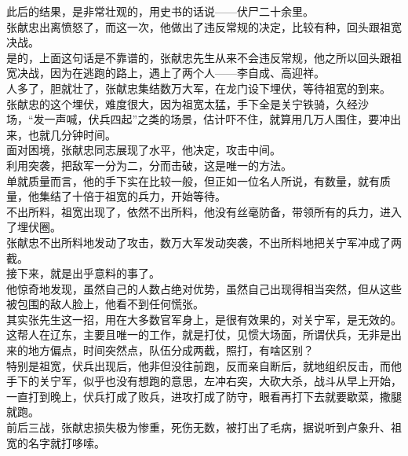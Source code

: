 \begin{multicols}{\theparacolNo}
此后的结果，是非常壮观的，用史书的话说——伏尸二十余里。\\

张献忠出离愤怒了，而这一次，他做出了违反常规的决定，比较有种，回头跟祖宽决战。\\

是的，上面这句话是不靠谱的，张献忠先生从来不会违反常规，他之所以回头跟祖宽决战，因为在逃跑的路上，遇上了两个人——李自成、高迎祥。\\

人多了，胆就壮了，张献忠集结数万大军，在龙门设下埋伏，等待祖宽的到来。\\

张献忠的这个埋伏，难度很大，因为祖宽太猛，手下全是关宁铁骑，久经沙场，“发一声喊，伏兵四起”之类的场景，估计吓不住，就算用几万人围住，要冲出来，也就几分钟时间。\\

面对困境，张献忠同志展现了水平，他决定，攻击中间。\\

利用突袭，把敌军一分为二，分而击破，这是唯一的方法。\\

单就质量而言，他的手下实在比较一般，但正如一位名人所说，有数量，就有质量，他集结了十倍于祖宽的兵力，开始等待。\\

不出所料，祖宽出现了，依然不出所料，他没有丝毫防备，带领所有的兵力，进入了埋伏圈。\\

张献忠不出所料地发动了攻击，数万大军发动突袭，不出所料地把关宁军冲成了两截。\\

接下来，就是出乎意料的事了。\\

他惊奇地发现，虽然自己的人数占绝对优势，虽然自己出现得相当突然，但从这些被包围的敌人脸上，他看不到任何慌张。\\

其实张先生这一招，用在大多数官军身上，是很有效果的，对关宁军，是无效的。这帮人在辽东，主要且唯一的工作，就是打仗，见惯大场面，所谓伏兵，无非是出来的地方偏点，时间突然点，队伍分成两截，照打，有啥区别？\\

特别是祖宽，伏兵出现后，他非但没往前跑，反而亲自断后，就地组织反击，而他手下的关宁军，似乎也没有想跑的意思，左冲右突，大砍大杀，战斗从早上开始，一直打到晚上，伏兵打成了败兵，进攻打成了防守，眼看再打下去就要歇菜，撒腿就跑。\\

前后三战，张献忠损失极为惨重，死伤无数，被打出了毛病，据说听到卢象升、祖宽的名字就打哆嗦。\\


\end{multicols}
